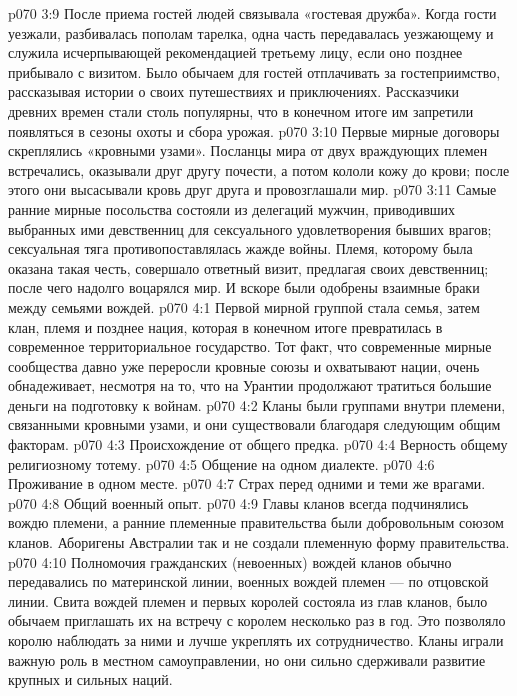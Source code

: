 \vs p070 3:9 После приема гостей людей связывала «гостевая дружба». Когда гости уезжали, разбивалась пополам тарелка, одна часть передавалась уезжающему и служила исчерпывающей рекомендацией третьему лицу, если оно позднее прибывало с визитом. Было обычаем для гостей отплачивать за гостеприимство, рассказывая истории о своих путешествиях и приключениях. Рассказчики древних времен стали столь популярны, что в конечном итоге им запретили появляться в сезоны охоты и сбора урожая.
\vs p070 3:10 Первые мирные договоры скреплялись «кровными узами». Посланцы мира от двух враждующих племен встречались, оказывали друг другу почести, а потом кололи кожу до крови; после этого они высасывали кровь друг друга и провозглашали мир.
\vs p070 3:11 Самые ранние мирные посольства состояли из делегаций мужчин, приводивших выбранных ими девственниц для сексуального удовлетворения бывших врагов; сексуальная тяга противопоставлялась жажде войны. Племя, которому была оказана такая честь, совершало ответный визит, предлагая своих девственниц; после чего надолго воцарялся мир. И вскоре были одобрены взаимные браки между семьями вождей.
\vs p070 4:1 Первой мирной группой стала семья, затем клан, племя и позднее нация, которая в конечном итоге превратилась в современное территориальное государство. Тот факт, что современные мирные сообщества давно уже переросли кровные союзы и охватывают нации, очень обнадеживает, несмотря на то, что на Урантии продолжают тратиться большие деньги на подготовку к войнам.
\vs p070 4:2 Кланы были группами внутри племени, связанными кровными узами, и они существовали благодаря следующим общим факторам.
\vs p070 4:3 \pc {}\bibnobreakspace Происхождение от общего предка.
\vs p070 4:4 \bibnobreakspace Верность общему религиозному тотему.
\vs p070 4:5 \bibnobreakspace Общение на одном диалекте.
\vs p070 4:6 \bibnobreakspace Проживание в одном месте.
\vs p070 4:7 \bibnobreakspace Страх перед одними и теми же врагами.
\vs p070 4:8 \bibnobreakspace Общий военный опыт.
\vs p070 4:9 \pc Главы кланов всегда подчинялись вождю племени, а ранние племенные правительства были добровольным союзом кланов. Аборигены Австралии так и не создали племенную форму правительства.
\vs p070 4:10 Полномочия гражданских (невоенных) вождей кланов обычно передавались по материнской линии, военных вождей племен --- по отцовской линии. Свита вождей племен и первых королей состояла из глав кланов, было обычаем приглашать их на встречу с королем несколько раз в год. Это позволяло королю наблюдать за ними и лучше укреплять их сотрудничество. Кланы играли важную роль в местном самоуправлении, но они сильно сдерживали развитие крупных и сильных наций.
